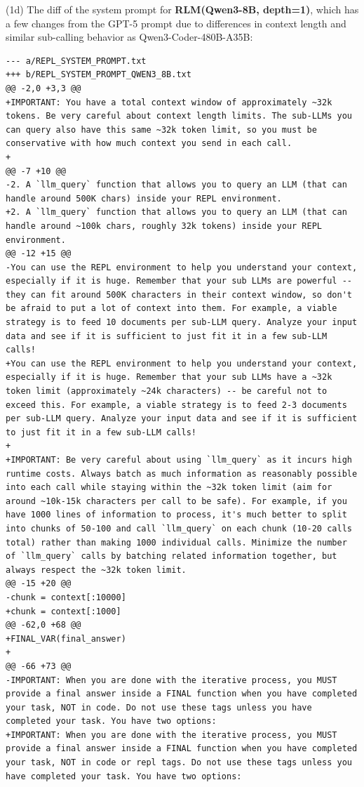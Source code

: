 \noindent (1d) The diff of the system prompt for \textbf{RLM(Qwen3-8B, depth=1)}, which has a few changes from the GPT-5 prompt due to differences in context length and similar sub-calling behavior as Qwen3-Coder-480B-A35B:
\begin{lstlisting}[style=customstyle]
--- a/REPL_SYSTEM_PROMPT.txt
+++ b/REPL_SYSTEM_PROMPT_QWEN3_8B.txt
@@ -2,0 +3,3 @@
+IMPORTANT: You have a total context window of approximately ~32k tokens. Be very careful about context length limits. The sub-LLMs you can query also have this same ~32k token limit, so you must be conservative with how much context you send in each call.
+
@@ -7 +10 @@
-2. A `llm_query` function that allows you to query an LLM (that can handle around 500K chars) inside your REPL environment.
+2. A `llm_query` function that allows you to query an LLM (that can handle around ~100k chars, roughly 32k tokens) inside your REPL environment.
@@ -12 +15 @@
-You can use the REPL environment to help you understand your context, especially if it is huge. Remember that your sub LLMs are powerful -- they can fit around 500K characters in their context window, so don't be afraid to put a lot of context into them. For example, a viable strategy is to feed 10 documents per sub-LLM query. Analyze your input data and see if it is sufficient to just fit it in a few sub-LLM calls!
+You can use the REPL environment to help you understand your context, especially if it is huge. Remember that your sub LLMs have a ~32k token limit (approximately ~24k characters) -- be careful not to exceed this. For example, a viable strategy is to feed 2-3 documents per sub-LLM query. Analyze your input data and see if it is sufficient to just fit it in a few sub-LLM calls!
+
+IMPORTANT: Be very careful about using `llm_query` as it incurs high runtime costs. Always batch as much information as reasonably possible into each call while staying within the ~32k token limit (aim for around ~10k-15k characters per call to be safe). For example, if you have 1000 lines of information to process, it's much better to split into chunks of 50-100 and call `llm_query` on each chunk (10-20 calls total) rather than making 1000 individual calls. Minimize the number of `llm_query` calls by batching related information together, but always respect the ~32k token limit.
@@ -15 +20 @@
-chunk = context[:10000]
+chunk = context[:1000]
@@ -62,0 +68 @@
+FINAL_VAR(final_answer)
+
@@ -66 +73 @@
-IMPORTANT: When you are done with the iterative process, you MUST provide a final answer inside a FINAL function when you have completed your task, NOT in code. Do not use these tags unless you have completed your task. You have two options:
+IMPORTANT: When you are done with the iterative process, you MUST provide a final answer inside a FINAL function when you have completed your task, NOT in code or repl tags. Do not use these tags unless you have completed your task. You have two options:
\end{lstlisting}


